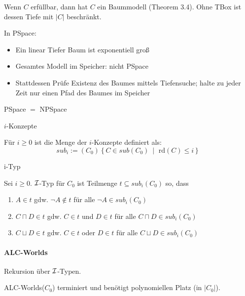 Wenn $C$ erfüllbar, dann hat $C$ ein Baummodell (Theorem 3.4). Ohne TBox ist dessen Tiefe mit $\left| C \right|$ beschränkt. 

In PSpace:

\begin{itemize}
\item
  Ein linear Tiefer Baum ist exponentiell groß
\item
  Gesamtes Modell im Speicher: nicht PSpace
\item
  Stattdessen Prüfe Existenz des Baumes mittels Tiefensuche; halte zu
  jeder Zeit nur einen Pfad des Baumes im Speicher
\end{itemize}

\begin{theorem}
PSpace $=$ NPSpace
\end{theorem}

\begin{definition}{$i$-Konzepte}

Für $i \geq 0$ ist die Menge der $i$-Konzepte definiert als:
$$sub_{i} := \left( C_{0} \right) \left\{ C \in sub\left( C_{0} \right)\  \middle| \text{\ rd}\left( C \right) \leq i \right\}$$
\end{definition}

\begin{definition}{i-Typ}

Sei $i \geq 0$. $\mathcal{I}$-Typ für $C_{0}$ ist Teilmenge
$t \subseteq sub_{i}\left( C_{0} \right)$ so, dass

\begin{enumerate}
\def\labelenumi{\arabic{enumi}.}
\item
  $A \in t$ gdw. $\neg A \notin t$ für alle
  $\neg A \in sub_{i}\left( C_{0} \right)$
\item
  $C \sqcap D \in t$ gdw. $C \in t$ und $D \in t$ für alle
  $C \sqcap D \in sub_{i}\left( C_{0} \right)$
\item
  $C \sqcup D \in t$ gdw. $C \in t$ oder $D \in t$ für alle
  $C \sqcup D \in sub_{i}\left( C_{0} \right)$
\end{enumerate}
\end{definition}

\paragraph{ALC-Worlds}\label{alc-worlds-1}

Rekursion über $\mathcal{I}$-Typen.

\begin{proposition}
ALC-Worlds($C_{0}$) terminiert und benötigt polynomiellen Platz (in $|C_0|$).
\end{proposition}

